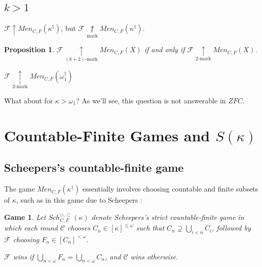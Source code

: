 \documentclass{beamer}
\newtheorem{proposition}[theorem]{Proposition}
\theoremstyle{example}
\newtheorem{game}[theorem]{Game}
\theoremstyle{definition}
\newcommand{\win}{\uparrow}
\newcommand{\kmarkwin}[1]{\underset{#1\text{-mark}}{\uparrow}}
\newcommand{\notmarkwin}{\underset{\text{mark}}{\not\uparrow}}
\newcommand{\oneptlind}[1]{#1^\dagger} %
\newcommand{\menGame}[1]{Men_{C,F}\left({#1}\right)}
\newcommand{\schFillStrictGame}[1]{Sch^{\cup,\subset}_{C,F}\left({#1}\right)}
\newcommand{\<}{\langle}
\renewcommand{\>}{\rangle}
\newcommand{\pl}[1]{\mathscr{#1}}
\newcommand{\term}{\textit}
\begin{document}
\subsection{$k>1$}

\begin{frame}

  \begin{example}
    \(\pl F\win\menGame{\oneptlind\kappa}\), but
    \(\pl F\notmarkwin\menGame{\oneptlind\kappa}\).
  \end{example}

  \pause

  \begin{proposition}
    \(\pl F\kmarkwin{(k+2)}\menGame{X}\) if and only if
    \(\pl F\kmarkwin{2}\menGame{X}\).
  \end{proposition}

  \pause

  \begin{example}
    \(\pl F\kmarkwin{2}\menGame{\oneptlind\omega_1}\)
  \end{example}

  \vpause

  What about for \(\kappa>\omega_1\)? As we'll see, this question
  is not answerable in \(ZFC\).
\end{frame}

\section{Countable-Finite Games and $S(\kappa)$}

\subsection{Scheepers's countable-finite game}

\begin{frame}
  The game \(\menGame{\oneptlind\kappa}\) essentially involves choosing
  countable and finite subsets of \(\kappa\), such as in this game due
  to Scheepers \cite{MR1129143}:

  \begin{game}
    Let \(\schFillStrictGame\kappa\) denote Scheepers's
    \term{strict countable-finite game}
    in which each round \(\pl C\) chooses \(C_n\in[\kappa]^{\leq\omega}\)
    such that \(C_n \supsetneq \bigcup_{i<n}C_i\), followed by \(\pl F\) choosing \(F_n\in[C_n]^{<\omega}\).

    \(\pl F\) wins if \(\bigcup_{n<\omega}F_n=\bigcup_{n<\omega}C_n\),
    and \(\pl C\) wins otherwise.
  \end{game}
\end{frame}
\end{document}
